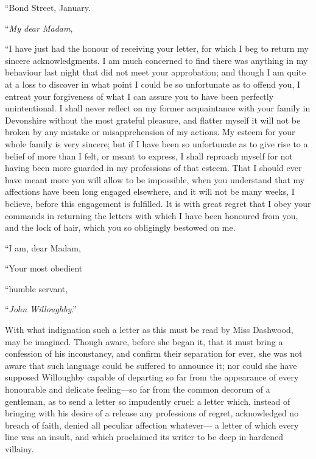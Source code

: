 \bigskip
                              ``Bond Street, January.
\medskip

     ``\emph{My dear Madam},
\medskip

     ``I have just had the honour of receiving your
     letter, for which I beg to return my sincere
     acknowledgments.  I am much concerned to find there
     was anything in my behaviour last night that did
     not meet your approbation; and though I am quite at
     a loss to discover in what point I could be so
     unfortunate as to offend you, I entreat your
     forgiveness of what I can assure you to have been
     perfectly unintentional.  I shall never reflect on
     my former acquaintance with your family in Devonshire
     without the most grateful pleasure, and flatter
     myself it will not be broken by any mistake or
     misapprehension of my actions.  My esteem for your
     whole family is very sincere; but if I have been so
     unfortunate as to give rise to a belief of more than
     I felt, or meant to express, I shall reproach myself
     for not having been more guarded in my professions
     of that esteem.  That I should ever have meant more
     you will allow to be impossible, when you understand
     that my affections have been long engaged elsewhere,
     and it will not be many weeks, I believe, before
     this engagement is fulfilled.  It is with great
     regret that I obey your commands in returning the
     letters with which I have been honoured from you,
     and the lock of hair, which you so obligingly bestowed
     on me.

     ``I am, dear Madam,

               ``Your most obedient

                    ``humble servant,

\medskip
                                        ``\emph{John Willoughby}.''
\bigskip

With what indignation such a letter as this must
be read by Miss Dashwood, may be imagined.  Though aware,
before she began it, that it must bring a confession
of his inconstancy, and confirm their separation for ever,
she was not aware that such language could be suffered
to announce it; nor could she have supposed Willoughby
capable of departing so far from the appearance of every
honourable and delicate feeling---so far from the common
decorum of a gentleman, as to send a letter so impudently
cruel: a letter which, instead of bringing with his desire
of a release any professions of regret, acknowledged no
breach of faith, denied all peculiar affection whatever---%
a letter of which every line was an insult, and which
proclaimed its writer to be deep in hardened villainy.


